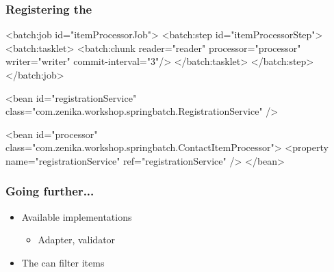 \begin{frame}[fragile]
\frametitle{Registering the }
\begin{xmlcode}
<batch:job id="itemProcessorJob">
  <batch:step id="itemProcessorStep">
    <batch:tasklet>
      <batch:chunk reader="reader" processor="processor" 
                   writer="writer" commit-interval="3"/>
    </batch:tasklet>
  </batch:step>
</batch:job>

<bean id="registrationService"
      class="com.zenika.workshop.springbatch.RegistrationService" />

<bean id="processor"
      class="com.zenika.workshop.springbatch.ContactItemProcessor">
  <property name="registrationService" ref="registrationService" />
</bean>
\end{xmlcode}
\end{frame}

\begin{frame}
 \frametitle{Going further...}
 \begin{itemize}
  \item Available  implementations
  \begin{itemize}
    \item Adapter, validator
  \end{itemize}
  \item The  can filter items
 \end{itemize}
\end{frame}

